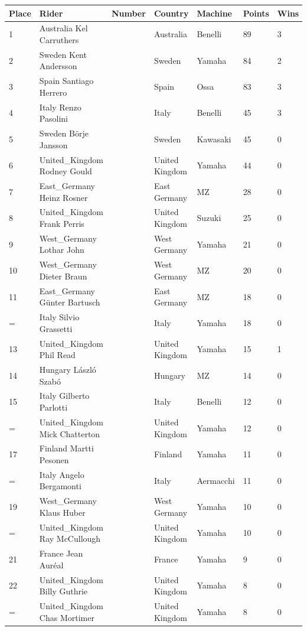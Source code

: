 \documentclass{article}
\begin{document}
\begin{tabular}{lllllll}
\toprule
Place & Rider & Number & Country & Machine & Points & Wins \\
\midrule
1 & Australia Kel Carruthers &  & Australia & Benelli & 89 & 3 \\
2 & Sweden Kent Andersson &  & Sweden & Yamaha & 84 & 2 \\
3 & Spain Santiago Herrero &  & Spain & Ossa & 83 & 3 \\
4 & Italy Renzo Pasolini &  & Italy & Benelli & 45 & 3 \\
5 & Sweden Börje Jansson &  & Sweden & Kawasaki & 45 & 0 \\
6 & United\_Kingdom Rodney Gould &  & United Kingdom & Yamaha & 44 & 0 \\
7 & East\_Germany Heinz Rosner &  & East Germany & MZ & 28 & 0 \\
8 & United\_Kingdom Frank Perris &  & United Kingdom & Suzuki & 25 & 0 \\
9 & West\_Germany Lothar John &  & West Germany & Yamaha & 21 & 0 \\
10 & West\_Germany Dieter Braun &  & West Germany & MZ & 20 & 0 \\
11 & East\_Germany Günter Bartusch &  & East Germany & MZ & 18 & 0 \\
= & Italy Silvio Grassetti &  & Italy & Yamaha & 18 & 0 \\
13 & United\_Kingdom Phil Read &  & United Kingdom & Yamaha & 15 & 1 \\
14 & Hungary László Szabó &  & Hungary & MZ & 14 & 0 \\
15 & Italy Gilberto Parlotti &  & Italy & Benelli & 12 & 0 \\
= & United\_Kingdom Mick Chatterton &  & United Kingdom & Yamaha & 12 & 0 \\
17 & Finland Martti Pesonen &  & Finland & Yamaha & 11 & 0 \\
= & Italy Angelo Bergamonti &  & Italy & Aermacchi & 11 & 0 \\
19 & West\_Germany Klaus Huber &  & West Germany & Yamaha & 10 & 0 \\
= & United\_Kingdom Ray McCullough &  & United Kingdom & Yamaha & 10 & 0 \\
21 & France Jean Auréal &  & France & Yamaha & 9 & 0 \\
22 & United\_Kingdom Billy Guthrie &  & United Kingdom & Yamaha & 8 & 0 \\
= & United\_Kingdom Chas Mortimer &  & United Kingdom & Yamaha & 8 & 0 \\

\end{tabular}
\end{document}
